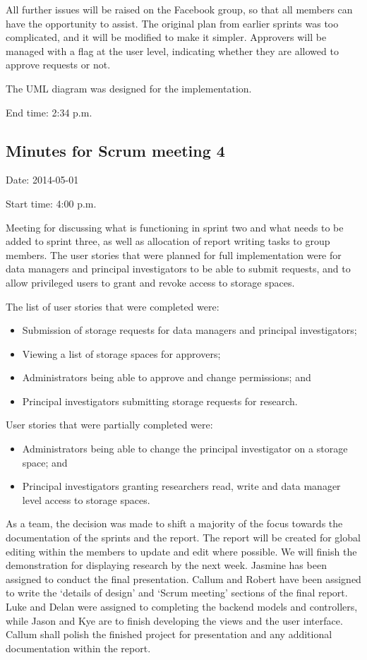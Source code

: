 \documentclass[a4paper,titlepage,12pt]{article}
\begin{document}
All further issues will be raised on the Facebook group, so that all members
can have the opportunity to assist. The original plan from earlier sprints was
too complicated, and it will be modified to make it simpler. Approvers will be
managed with a flag at the user level, indicating whether they are allowed to
approve requests or not.

The UML diagram was designed for the implementation.

End time: 2:34 p.m.

\subsection{Minutes for Scrum meeting 4}

Date: 2014-05-01

Start time: 4:00 p.m.

Meeting for discussing what is functioning in sprint two and what needs to be
added to sprint three, as well as allocation of report writing tasks to group
members. The user stories that were planned for full implementation were for
data managers and principal investigators to be able to submit requests, and to
allow privileged users to grant and revoke access to storage spaces.

The list of user stories that were completed were:

\begin{itemize}
	\item Submission of storage requests for data managers and principal
	      investigators;
	\item Viewing a list of storage spaces for approvers;
	\item Administrators being able to approve and change permissions; and
	\item Principal investigators submitting storage requests for research.
\end{itemize}

User stories that were partially completed were:

\begin{itemize}
	\item Administrators being able to change the principal investigator on
	      a storage space; and
	\item Principal investigators granting researchers read, write and data
	      manager level access to storage spaces.
\end{itemize}

As a team, the decision was made to shift a majority of the focus towards the
documentation of the sprints and the report. The report will be created for
global editing within the members to update and edit where possible. We will
finish the demonstration for displaying research by the next week. Jasmine
has been assigned to conduct the final presentation. Callum and Robert have
been assigned to write the `details of design' and `Scrum meeting' sections of
the final report. Luke and Delan were assigned to completing the backend models
and controllers, while Jason and Kye are to finish developing the views and the
user interface. Callum shall polish the finished project for presentation and
any additional documentation within the report.
\end{document}
